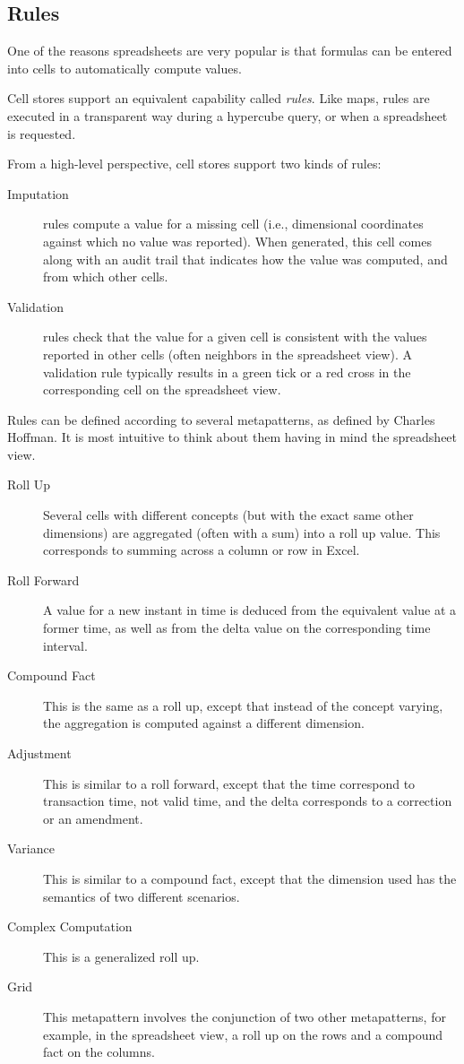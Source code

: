 \documentclass{acm_proc_article-sp}
\begin{document}
\subsection{Rules}

One of the reasons spreadsheets are very popular is that formulas can be entered into cells to automatically compute values.

Cell stores support an equivalent capability called \emph{rules}. Like maps, rules are executed in a transparent way during a hypercube query, or when a spreadsheet is requested.

From a high-level perspective, cell stores support two kinds of rules:

\begin{description}
\item[Imputation] rules compute a value for a missing cell (i.e., dimensional coordinates against which no value was reported). When generated, this cell comes along with an audit trail that indicates how the value was computed, and from which other cells.
\item[Validation] rules check that the value for a given cell is consistent with the values reported in other cells (often neighbors in the spreadsheet view). A validation rule typically results in a green tick or a red cross in the corresponding cell on the spreadsheet view.
\end{description}

Rules can be defined according to several metapatterns, as defined by Charles Hoffman. It is most intuitive to think about them having in mind the spreadsheet view.

\begin{description}
\item [Roll Up] Several cells with different concepts (but with the exact same other dimensions) are aggregated (often with a sum) into a roll up value. This corresponds to summing across a column or row in Excel.
\item [Roll Forward] A value for a new instant in time is deduced from the equivalent value at a former time, as well as from the delta value on the corresponding time interval.
\item [Compound Fact] This is the same as a roll up, except that instead of the concept varying, the aggregation is computed against a different dimension.
\item [Adjustment] This is similar to a roll forward, except that the time correspond to transaction time, not valid time, and the delta corresponds to a correction or an amendment.
\item [Variance] This is similar to a compound fact, except that the dimension used has the semantics of two different scenarios.
\item [Complex Computation] This is a generalized roll up.
\item [Grid] This metapattern involves the conjunction of two other metapatterns, for example, in the spreadsheet view, a roll up on the rows and a compound fact on the columns.
\end{description}
\end{document}
